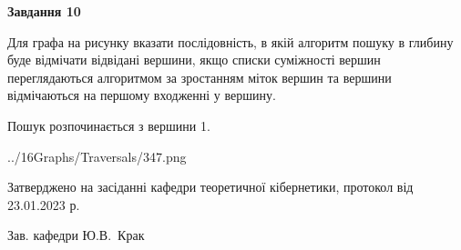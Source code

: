 \documentclass[12pt, ukrainian]{article}
\begin{document}
{\begin {large}
{\begin {center}\textbf{Завдання 10}\end {center}}\par
Для графа на рисунку вказати послідовність, в якій алгоритм пошуку в глибину буде відмічати відвідані вершини, якщо списки суміжності вершин переглядаються алгоритмом за зростанням міток вершин та вершини відмічаються на першому вход\-женні у вершину.\par
Пошук розпочинається з вершини 1.\par

\begin{center}
	{../16Graphs/Traversals/347.png}
\end{center}\par
\newpage


\end {large}
}
{\smallskip \begin {small} Затверджено на засіданні кафедри теоретичної кібернетики, протокол  від   23.01.2023 р.\par\smallskip\smallskip
{\parbox {6.5 cm}{Зав. кафедри \dotfill Ю.В.~Крак}} \end{small}}
\end{document}
